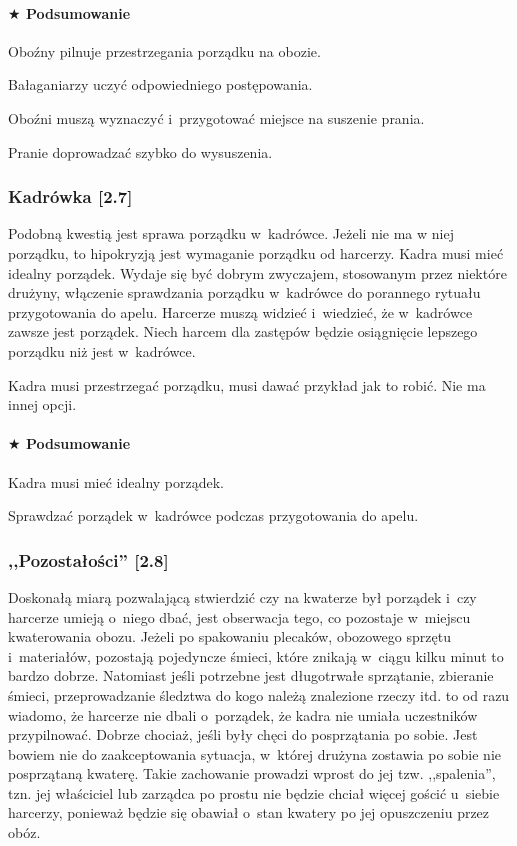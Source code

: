 \documentclass[a5paper,10pt,titlepage,twoside]{article}
\newcommand*{\thecheckbox}{\hss$\Box$} %
\newenvironment*{checklist}
{\list{}{%
\renewcommand*{\makelabel}[1]{\thecheckbox}}}
{\endlist}
\begin{document}
\paragraph{$\bigstar$ Podsumowanie}
\begin{checklist}
\item Oboźny pilnuje przestrzegania porządku na obozie.
\item Bałaganiarzy uczyć odpowiedniego postępowania.
\item Oboźni muszą wyznaczyć i~przygotować miejsce na suszenie prania.
\item Pranie doprowadzać szybko do wysuszenia.
\end{checklist}
\subsubsection{Kadrówka [2.7]}
Podobną kwestią jest sprawa porządku w~kadrówce. Jeżeli nie ma w niej porządku, to hipokryzją jest wymaganie porządku od harcerzy. Kadra musi mieć idealny porządek. Wydaje się być dobrym zwyczajem, stosowanym przez niektóre drużyny, włączenie sprawdzania porządku w~kadrówce do porannego rytuału przygotowania do apelu. Harcerze muszą widzieć i~wiedzieć, że w~kadrówce zawsze jest porządek. Niech harcem dla zastępów będzie osiągnięcie lepszego porządku niż jest w~kadrówce.

Kadra musi przestrzegać porządku, musi dawać przykład jak to robić. Nie ma innej opcji.
\paragraph{$\bigstar$ Podsumowanie}
\begin{checklist}
\item Kadra musi mieć idealny porządek.
\item Sprawdzać porządek w~kadrówce podczas przygotowania do apelu.
\end{checklist}
\subsubsection{,,Pozostałości'' [2.8]}
Doskonałą miarą pozwalającą stwierdzić czy na kwaterze był porządek i~czy harcerze umieją o~niego dbać, jest obserwacja tego, co pozostaje w~miejscu kwaterowania obozu. Jeżeli po spakowaniu plecaków, obozowego sprzętu i~materiałów, pozostają pojedyncze śmieci, które znikają w~ciągu kilku minut to bardzo dobrze. Natomiast jeśli potrzebne jest długotrwałe sprzątanie, zbieranie śmieci, przeprowadzanie śledztwa do kogo należą znalezione rzeczy itd. to od razu wiadomo, że harcerze nie dbali o~porządek, że kadra nie umiała uczestników przypilnować. Dobrze chociaż, jeśli były chęci do posprzątania po sobie. Jest bowiem nie do zaakceptowania sytuacja, w~której drużyna zostawia po sobie nie posprzątaną kwaterę. Takie zachowanie prowadzi wprost do jej tzw. ,,spalenia'', tzn. jej właściciel lub zarządca po prostu nie będzie chciał więcej gościć u~siebie harcerzy, ponieważ będzie się obawiał o~stan kwatery po jej opuszczeniu przez obóz.
\end{document}
